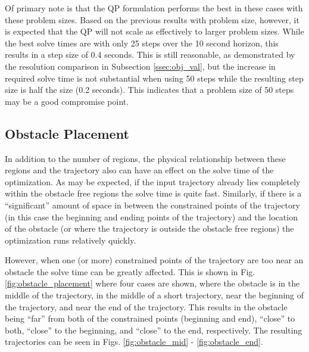 Of primary note is that the QP formulation performs the best in these cases with these problem sizes. Based on the previous results with problem size, however, it is expected that the QP will not scale as effectively to larger problem sizes. While the best solve times are with only 25 steps over the 10 second horizon, this results in a step size of 0.4 seconds. This is still reasonable, as demonstrated by the resolution comparison in Subsection \ref{ssec:obj_val}, but the increase in required solve time is not substantial when using 50 steps while the resulting step size is half the size (0.2 seconds). This indicates that a problem size of 50 steps may be a good compromise point.

\subsection{Obstacle Placement} \label{ssec:obstacle_placement}
In addition to the number of regions, the physical relationship between these regions and the trajectory also can have an effect on the solve time of the optimization. As may be expected, if the input trajectory already lies completely within the obstacle free regions the solve time is quite fast. Similarly, if there is a ``significant'' amount of space in between the constrained points of the trajectory (in this case the beginning and ending points of the trajectory) and the location of the obstacle (or where the trajectory is outside the obstacle free regions) the optimization runs relatively quickly.

However, when one (or more) constrained points of the trajectory are too near an obstacle the solve time can be greatly affected. This is shown in Fig. \ref{fig:obstacle_placement} where four cases are shown, where the obstacle is in the middle of the trajectory, in the middle of a short trajectory, near the beginning of the trajectory, and near the end of the trajectory. This results in the obstacle being ``far'' from both of the constrained points (beginning and end), ``close'' to both, ``close'' to the beginning, and ``close'' to the end, respectively. The resulting trajectories can be seen in Figs. \ref{fig:obstacle_mid} - \ref{fig:obstacle_end}.

